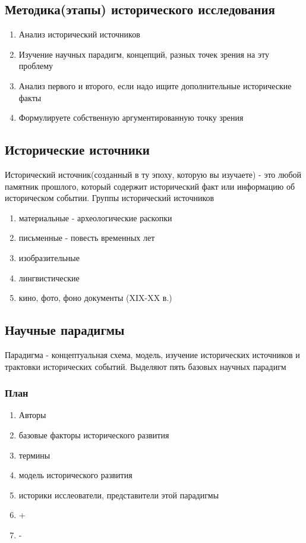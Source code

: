 \documentclass[a4paper]{article}
\begin{document}
\subsection{Методика(этапы) исторического исследования}

\begin{enumerate}
    \item Анализ исторический источников
    \item Изучение научных парадигм, концепций, разных точек зрения на эту проблему
    \item Анализ первого и второго, если надо ищите дополнительные исторические факты
    \item Формулируете собственную аргументированную точку зрения
\end{enumerate}

\subsection{Исторические источники}
Исторический источник(созданный в ту эпоху, которую вы изучаете) - это любой памятник прошлого, который содержит исторический факт или информацию об историческом событии.
Группы исторический источников

\begin{enumerate}
    \item материальные - археологические раскопки
    \item письменные - повесть временных лет
    \item изобразительные
    \item лингвистические
    \item кино, фото, фоно документы (XIX-XX в.)
\end{enumerate}

\subsection{Научные парадигмы}
Парадигма - концептуальная схема, модель, изучение исторических источников и трактовки исторических событий.
Выделяют пять базовых научных парадигм

\subsubsection{План}
\begin{enumerate}
    \item Авторы
    \item базовые факторы исторического развития
    \item термины
    \item модель исторического развития
    \item историки исслеователи, представители этой парадигмы
    \item +
    \item -
\end{enumerate}
\end{document}
